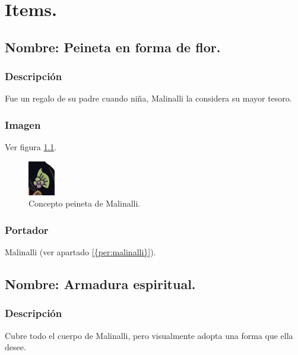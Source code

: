 \chapter{Items.}
	\section{Nombre: Peineta en forma de flor.}\label{item:peineta}
	\subsection{Descripción}
	Fue un regalo de su padre cuando niña, Malinalli la considera su mayor tesoro.
	\subsection{Imagen}
		Ver figura \ref{fig:peineta}.
		\begin{figure}
			\centering
			\includegraphics[height=0.2 \textheight]{Imagenes/Peineta}
			\caption{Concepto peineta de Malinalli.}
			\label{fig:peineta}
		\end{figure}
	\subsection{Portador}
	Malinalli (ver apartado \ref{{per:malinalli}}).

	\section{Nombre: Armadura espiritual.}\label{item:armadura}
	\subsection{Descripción}
	Cubre todo el cuerpo de Malinalli, pero visualmente adopta una forma que ella desee.
